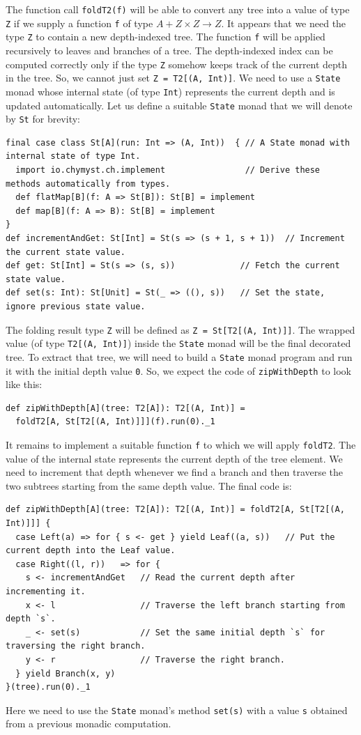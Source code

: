 The function call \lstinline!foldT2(f)! will be able to convert any
tree into a value of type \lstinline!Z! if we supply a function \lstinline!f!
of type $A+Z\times Z\rightarrow Z$. It appears that we need the type
\lstinline!Z! to contain a new depth-indexed tree. The function \lstinline!f!
will be applied recursively to leaves and branches of a tree. The
depth-indexed index can be computed correctly only if the type \lstinline!Z!
somehow keeps track of the current depth in the tree. So, we cannot
just set \lstinline!Z = T2[(A, Int)]!. We need to use a \lstinline!State!
monad whose internal state (of type \lstinline!Int!) represents the
current depth and is updated automatically. Let us define a suitable
\lstinline!State! monad that we will denote by \lstinline!St! for
brevity:
\begin{lstlisting}
final case class St[A](run: Int => (A, Int))  { // A State monad with internal state of type Int.
  import io.chymyst.ch.implement                // Derive these methods automatically from types.
  def flatMap[B](f: A => St[B]): St[B] = implement
  def map[B](f: A => B): St[B] = implement
}
def incrementAndGet: St[Int] = St(s => (s + 1, s + 1))  // Increment the current state value.
def get: St[Int] = St(s => (s, s))             // Fetch the current state value.
def set(s: Int): St[Unit] = St(_ => ((), s))   // Set the state, ignore previous state value.
\end{lstlisting}
The folding result type \lstinline!Z! will be defined as \lstinline!Z = St[T2[(A, Int)]]!.
The wrapped value (of type \lstinline!T2[(A, Int)]!) inside the \lstinline!State!
monad will be the final decorated tree. To extract that tree, we will
need to build a \lstinline!State! monad program and run it with the
initial depth value \lstinline!0!. So, we expect the code of \lstinline!zipWithDepth!
to look like this:
\begin{lstlisting}
def zipWithDepth[A](tree: T2[A]): T2[(A, Int)] =
  foldT2[A, St[T2[(A, Int)]]](f).run(0)._1
\end{lstlisting}

It remains to implement a suitable function \lstinline!f! to which
we will apply \lstinline!foldT2!. The value of the internal state
represents the current depth of the tree element. We need to increment
that depth whenever we find a branch and then traverse the two subtrees
starting from the same depth value. The final code is:
\begin{lstlisting}
def zipWithDepth[A](tree: T2[A]): T2[(A, Int)] = foldT2[A, St[T2[(A, Int)]]] {
  case Left(a) => for { s <- get } yield Leaf((a, s))   // Put the current depth into the Leaf value.
  case Right((l, r))   => for {
    s <- incrementAndGet   // Read the current depth after incrementing it.
    x <- l                 // Traverse the left branch starting from depth `s`.
    _ <- set(s)            // Set the same initial depth `s` for traversing the right branch.       
    y <- r                 // Traverse the right branch.
  } yield Branch(x, y)
}(tree).run(0)._1
\end{lstlisting}
Here we need to use the \lstinline!State! monad\textsf{'}s method \lstinline!set(s)!
with a value \lstinline!s! obtained from a previous monadic computation.

